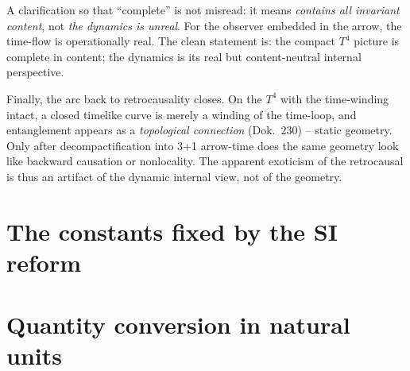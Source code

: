 A clarification so that ``complete'' is not misread: it means \emph{contains all
invariant content}, not \emph{the dynamics is unreal}. For the observer embedded in
the arrow, the time-flow is operationally real. The clean statement is: the
compact $T^4$ picture is complete in content; the dynamics is its real but
content-neutral internal perspective.

Finally, the arc back to retrocausality closes. On the $T^4$ with the time-winding
intact, a closed timelike curve is merely a winding of the time-loop, and
entanglement appears as a \emph{topological connection} (Dok.~230) -- static
geometry. Only after decompactification into 3+1 arrow-time does the same geometry
look like backward causation or nonlocality. The apparent exoticism of the
retrocausal is thus an artifact of the dynamic internal view, not of the geometry.

\section{The constants fixed by the SI reform}

\begin{table}[htbp]
  \centering
  \caption{The constants fixed by the 2019 SI reform (the ``machinery'').
           They carry no physics, only scale, and become~$1$ in natural units.}
  \label{tab:si-fixiert-en}
\end{table}

\section{Quantity conversion in natural units}

